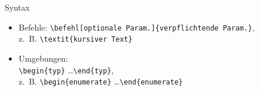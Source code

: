 
\begin{frame}[fragile]{Syntax}

	\begin{itemize}[<+-|alert@+>]
		\item Befehle: \verb|\befehl[optionale Param.]{verpflichtende Param.}|, \\z.~B. \verb|\textit{kursiver Text}|
		\item Umgebungen:\\ \verb|\begin{typ}| \dots \verb|\end{typ}|, \\z.~B. \verb|\begin{enumerate}| \dots \verb|\end{enumerate}|
	\end{itemize}

\end{frame}

